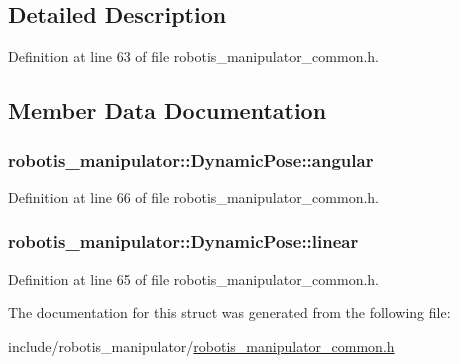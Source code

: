 \subsection{Detailed Description}


Definition at line 63 of file robotis\+\_\+manipulator\+\_\+common.\+h.



\subsection{Member Data Documentation}
\subsubsection[{\texorpdfstring{angular}{angular}}]{ robotis\+\_\+manipulator\+::\+Dynamic\+Pose\+::angular}\hypertarget{structrobotis__manipulator_1_1_dynamic_pose_a424459b0d1108f1e65594f5d193cbae6}{}\label{structrobotis__manipulator_1_1_dynamic_pose_a424459b0d1108f1e65594f5d193cbae6}


Definition at line 66 of file robotis\+\_\+manipulator\+\_\+common.\+h.

\subsubsection[{\texorpdfstring{linear}{linear}}]{ robotis\+\_\+manipulator\+::\+Dynamic\+Pose\+::linear}\hypertarget{structrobotis__manipulator_1_1_dynamic_pose_a45f314d8e2d3f78a4bc9c2aa72f0badc}{}\label{structrobotis__manipulator_1_1_dynamic_pose_a45f314d8e2d3f78a4bc9c2aa72f0badc}


Definition at line 65 of file robotis\+\_\+manipulator\+\_\+common.\+h.



The documentation for this struct was generated from the following file\+:\begin{DoxyCompactItemize}
\item 
include/robotis\+\_\+manipulator/\hyperlink{robotis__manipulator__common_8h}{robotis\+\_\+manipulator\+\_\+common.\+h}\end{DoxyCompactItemize}
